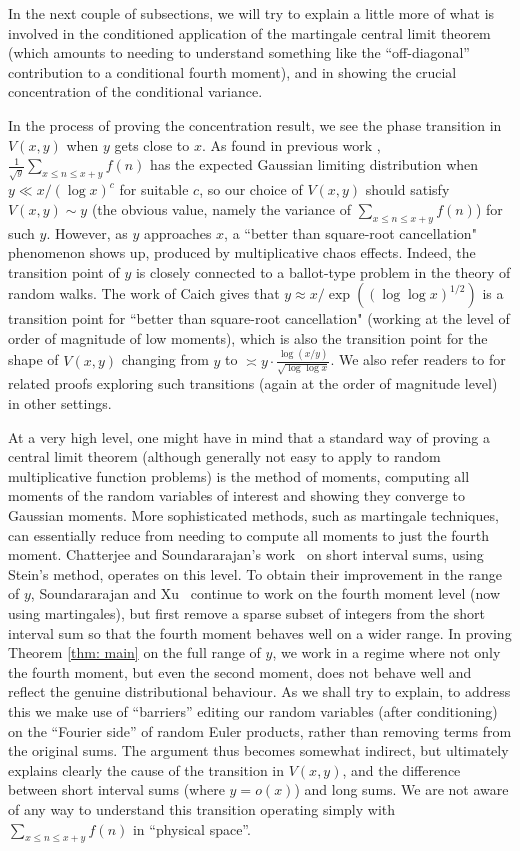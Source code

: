 \documentclass[12pt, notitlepage]{amsart}
\numberwithin{equation}{section}
\theoremstyle{remark}
\theoremstyle{definition}
\theoremstyle{remark}
\numberwithin{equation}{section}
\begin{document}
In the next couple of subsections, we will try to explain a little more of what is involved in the conditioned application of the martingale central limit theorem (which amounts to needing to understand something like the ``off-diagonal'' contribution to a conditional fourth moment), and in showing the crucial concentration of the conditional variance.

In the process of proving the concentration result, we see the phase transition in $V(x, y)$ when $y$ gets close to $x$. As found in previous work \cite{SoundXu, CS}, $\frac{1}{\sqrt{y}} \sum_{x\le n \le x+y}f(n)$ has the expected Gaussian limiting distribution when $y\ll x/(\log x)^{c}$ for suitable $c$, so our choice of $V(x, y)$ should satisfy $V(x, y)\sim  y$ (the obvious value, namely the variance of $\sum_{x\le n \le x+y}f(n)$) for such $y$.  
However, as $y$ approaches $x$, a ``better than square-root cancellation" phenomenon shows up, produced by multiplicative chaos effects. Indeed, the transition point of $y$ is closely connected to a ballot-type problem in the theory of random walks. The work of Caich \cite{caichshort} gives that $y\approx x/\exp((\log \log x)^{1/2})$ is a transition point for ``better than square-root cancellation" (working at the level of order of magnitude of low moments), which is also the transition point for the shape of $V(x, y)$ changing from $y$ to $ \asymp y \cdot \frac{\log(x/y)}{\sqrt{\log \log x}}$. We also refer readers to \cite{Chang, Xu} for related proofs exploring such transitions (again at the order of magnitude level) in other settings.

At a very high level, one might have in mind that a standard way of proving a central limit theorem (although generally not easy to apply to random multiplicative function problems) is the method of moments, computing all moments of the random variables of interest and showing they converge to Gaussian moments. More sophisticated methods, such as martingale techniques, can essentially reduce from needing to compute all moments to just the fourth moment. Chatterjee and Soundararajan's work~\cite{CS} on short interval sums, using Stein's method, operates on this level. To obtain their improvement in the range of $y$, Soundararajan and Xu~\cite{SoundXu} continue to work on the fourth moment level (now using martingales), but first remove a sparse subset of integers from the short interval sum so that the fourth moment behaves well on a wider range. In proving Theorem \ref{thm: main} on the full range of $y$, we work in a regime where not only the fourth moment, but even the second moment, does not behave well and reflect the genuine distributional behaviour. As we shall try to explain, to address this we make use of ``barriers'' editing our random variables (after conditioning) on the ``Fourier side'' of random Euler products, rather than removing terms from the original sums. The argument thus becomes somewhat indirect, but ultimately explains clearly the cause of the transition in $V(x,y)$, and the difference between short interval sums (where $y=o(x)$) and long sums. We are not aware of any way to understand this transition operating simply with $\sum_{x\le n \le x+y}f(n)$ in ``physical space''.
\end{document}
